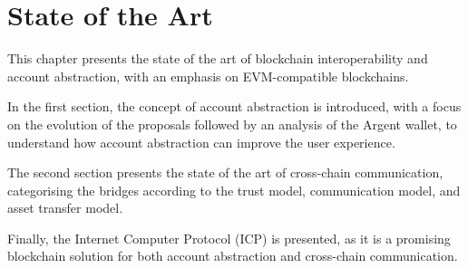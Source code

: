 \chapter{State of the Art}
\label{chap:state_of_the_art}

This chapter presents the state of the art of blockchain interoperability and account abstraction, with an emphasis on EVM-compatible blockchains.\cite{evm} 

In the first section, the concept of account abstraction is introduced, with a focus on the evolution of the proposals followed by an analysis of the Argent wallet, to understand how account abstraction can improve the user experience.

The second section presents the state of the art of cross-chain communication, categorising the bridges according to the trust model, communication model, and asset transfer model. 

Finally, the Internet Computer Protocol (ICP) is presented, as it is a promising blockchain solution for both account abstraction and cross-chain communication. 





